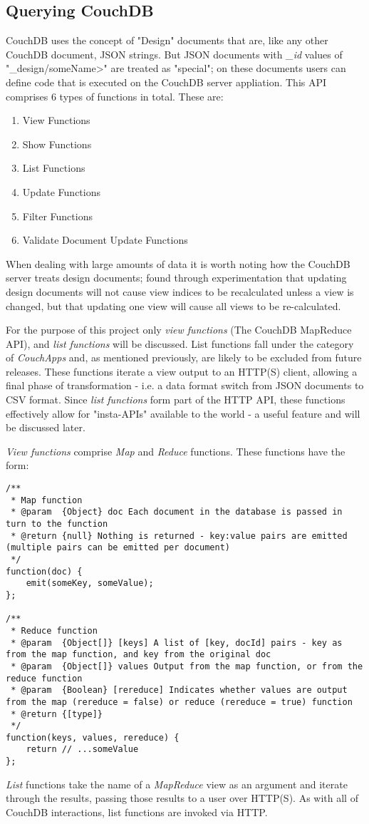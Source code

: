 \subsection{Querying CouchDB}
CouchDB uses the concept of "Design" documents that are, like any other CouchDB document, JSON strings. But JSON documents with \textit{\_id} values of "\_design/someName>" are treated as "special"; on these documents users can define code that is executed on the CouchDB server appliation. This API comprises 6 types of functions in total. These are:

\begin{enumerate}
    \item View Functions
    \item Show Functions
    \item List Functions
    \item Update Functions
    \item Filter Functions
    \item Validate Document Update Functions
\end{enumerate}

When dealing with large amounts of data it is worth noting how the CouchDB server treats design documents; \cite{Sharma2014} found through experimentation that updating design documents will not cause view indices to be recalculated unless a view is changed, but that updating one view will cause all views to be re-calculated.

For the purpose of this project only \textit{view functions} (The CouchDB MapReduce API), and \textit{list functions} will be discussed. List functions fall under the category of \textit{CouchApps} and, as mentioned previously, are likely to be excluded from future releases. These functions iterate a view output to an HTTP(S) client, allowing a final phase of transformation - i.e. a data format switch from JSON documents to CSV format. Since \textit{list functions} form part of the HTTP API, these functions effectively allow for "insta-APIs" available to the world - a useful feature and will be discussed later.

\textit{View functions} comprise \textit{Map} and \textit{Reduce} functions. These functions have the form:

\begin{verbatim} 
/**
 * Map function
 * @param  {Object} doc Each document in the database is passed in turn to the function
 * @return {null} Nothing is returned - key:value pairs are emitted (multiple pairs can be emitted per document)
 */
function(doc) {
    emit(someKey, someValue);
};

/**
 * Reduce function
 * @param  {Object[]} [keys] A list of [key, docId] pairs - key as from the map function, and key from the original doc
 * @param  {Object[]} values Output from the map function, or from the reduce function
 * @param  {Boolean} [rereduce] Indicates whether values are output from the map (rereduce = false) or reduce (rereduce = true) function
 * @return {[type]}
 */
function(keys, values, rereduce) {
    return // ...someValue
};
\end{verbatim}

\textit{List} functions take the name of a \textit{MapReduce} view as an argument and iterate through the results, passing those results to a user over HTTP(S). As with all of CouchDB interactions, list functions are invoked via HTTP.